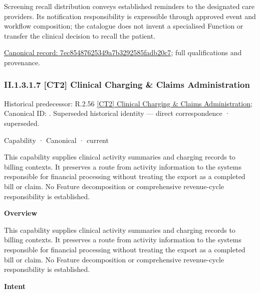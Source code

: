 Screening recall distribution conveys established reminders to the designated care providers. Its notification responsibility is expressible through approved event and workflow composition; the catalogue does not invent a specialised Function or transfer the clinical decision to recall the patient.


{\footnotesize \href{../../../../../../../continuum/strategy/capability/feature/7ec85487625349a7b3292585fadb20c7.md}{Canonical record: 7ec85487625349a7b3292585fadb20c7}; full qualifications and provenance.}\par
\subsubsection*{II.1.3.1.7 [CT2] Clinical Charging \& Claims Administration}
\label{navigation:II.1.3.1.7}

{\small Historical predecessor: R.2.56 \hyperref[element:44433108cc8f4f5f9d7581f9e5b29eb5]{[CT2] Clinical Charging \& Claims Administration}; Canonical ID: \texttt{}. Superseded historical identity — direct correspondence · superseded.}\par
\label{element:af78ab7c89454a608cd4d34ec7703331}
{\small Capability · Canonical · current}\par

This capability supplies clinical activity summaries and charging records to billing contexts. It preserves a route from activity information to the systems responsible for financial processing without treating the export as a completed bill or claim. No Feature decomposition or comprehensive revenue-cycle responsibility is established.



\textbf{Overview}



This capability supplies clinical activity summaries and charging records to billing contexts. It preserves a route from activity information to the systems responsible for financial processing without treating the export as a completed bill or claim. No Feature decomposition or comprehensive revenue-cycle responsibility is established.



\textbf{Intent}



